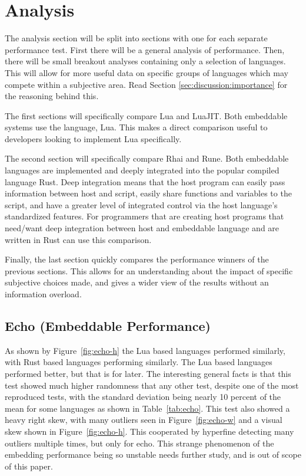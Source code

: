 \section{Analysis} \label{sec:analysis}
The analysis section will be split into sections with one for each separate performance test. First there will be a general analysis of performance. Then, there will be small breakout analyses containing only a selection of languages. This will allow for more useful data on specific groups of languages which may compete within a subjective area. Read Section \ref{sec:discussion:importance} for the reasoning behind this.

The first sections will specifically compare Lua and LuaJIT. Both embeddable systems use the language, Lua. This makes a direct comparison useful to developers looking to implement Lua specifically.

The second section will specifically compare Rhai and Rune. Both embeddable languages are implemented and deeply integrated into the popular compiled language Rust. Deep integration means that the host program can easily pass information between host and script, easily share functions and variables to the script, and have a greater level of integrated control via the host language's standardized features. For programmers that are creating host programs that need/want deep integration between host and embeddable language and are written in Rust can use this comparison.

Finally, the last section quickly compares the performance winners of the previous sections. This allows for an understanding about the impact of specific subjective choices made, and gives a wider view of the results without an information overload.

\subsection{Echo (Embeddable Performance)} \label{sec:analysis:echo}
As shown by Figure~\ref{fig:echo-h} the Lua based languages performed similarly, with Rust based languages performing similarly. The Lua based languages performed better, but that is for later. The interesting general facts is that this test showed much higher randomness that any other test, despite one of the most reproduced tests, with the standard deviation being nearly 10 percent of the mean for some languages as shown in Table~\ref{tab:echo}. This test also showed a heavy right skew, with many outliers seen in Figure~\ref{fig:echo-w} and a visual skew shown in Figure~\ref{fig:echo-h}. This cooperated by hyperfine detecting many outliers multiple times, but only for echo. This strange phenomenon of the embedding performance being so unstable needs further study, and is out of scope of this paper.

